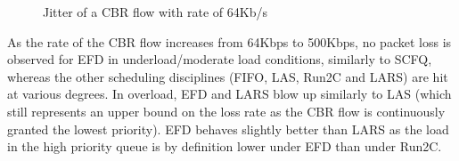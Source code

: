 \documentclass[preprint,12pt]{elsarticle}
\begin{document}
\begin{figure}[ht]
  \centering
  \caption{Jitter of a CBR flow with rate of 64Kb/s}
  \label{fig:jitter64}
\end{figure}




As the rate of the CBR flow increases from 64Kbps to 500Kbps, no packet loss is observed for EFD in underload/moderate load  conditions, similarly to SCFQ, whereas  the other scheduling disciplines (FIFO, LAS, Run2C and LARS) are hit at  various degrees. In overload, EFD and LARS blow up similarly to LAS (which still represents an upper bound on the loss rate as the CBR flow is continuously granted the lowest priority). EFD behaves slightly better than LARS as the load in the high priority queue is by definition lower under EFD than under Run2C.%
\end{document}
